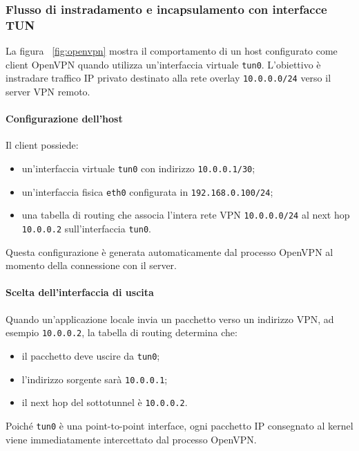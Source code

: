 \subsubsection{Flusso di instradamento e incapsulamento con interfacce TUN}

La figura ~\ref{fig:openvpn} mostra il comportamento di un host configurato come client OpenVPN quando utilizza
un'interfaccia virtuale \texttt{tun0}. L’obiettivo è instradare traffico IP privato destinato alla rete
overlay \texttt{10.0.0.0/24} verso il server VPN remoto.

\paragraph{Configurazione dell’host}

Il client possiede:

\begin{itemize}
    \item un’interfaccia virtuale \texttt{tun0} con indirizzo \texttt{10.0.0.1/30};
    \item un’interfaccia fisica \texttt{eth0} configurata in \texttt{192.168.0.100/24};
    \item una tabella di routing che associa l’intera rete VPN \texttt{10.0.0.0/24} al next hop
          \texttt{10.0.0.2} sull'interfaccia \texttt{tun0}.
\end{itemize}

Questa configurazione è generata automaticamente dal processo OpenVPN al momento della
connessione con il server.

\paragraph{Scelta dell’interfaccia di uscita}

Quando un’applicazione locale invia un pacchetto verso un indirizzo VPN, ad esempio
\texttt{10.0.0.2}, la tabella di routing determina che:

\begin{itemize}
    \item il pacchetto deve uscire da \texttt{tun0};
    \item l’indirizzo sorgente sarà \texttt{10.0.0.1};
    \item il next hop del sottotunnel è \texttt{10.0.0.2}.
\end{itemize}

Poiché \texttt{tun0} è una point-to-point interface, ogni pacchetto IP consegnato al kernel
viene immediatamente intercettato dal processo OpenVPN.

